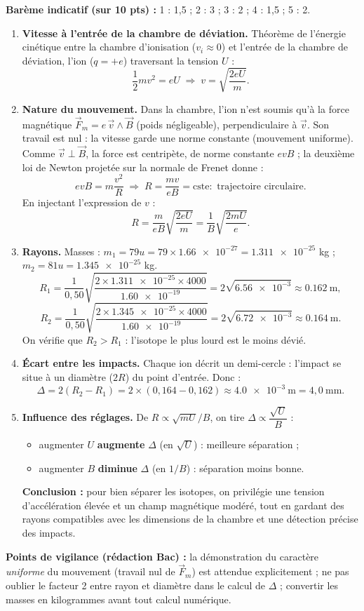 \documentclass[11pt]{article}
\begin{document}
\begin{corrige}
\textbf{Barème indicatif (sur 10 pts) :} 1 : 1,5 ; 2 : 3 ; 3 : 2 ; 4 : 1,5 ; 5 : 2.

\begin{enumerate}
\item \textbf{Vitesse à l'entrée de la chambre de déviation.} Théorème de l'énergie cinétique entre la chambre d'ionisation ($v_i \approx 0$) et l'entrée de la chambre de déviation, l'ion  ($q = +e$) traversant la tension $U$ :
\[
\frac{1}{2}mv^2 = eU \;\Longrightarrow\; \boxed{v = \sqrt{\frac{2eU}{m}}}.
\]
\item \textbf{Nature du mouvement.} Dans la chambre, l'ion n'est soumis qu'à la force magnétique $\vec{F}_m = e\,\vec{v}\wedge\vec{B}$ (poids négligeable), perpendiculaire à $\vec{v}$. Son travail est nul : la vitesse garde une norme constante (mouvement uniforme). Comme $\vec{v}\perp\vec{B}$, la force est centripète, de norme constante $evB$ ; la deuxième loi de Newton projetée sur la normale de Frenet donne :
\[
evB = m\frac{v^2}{R} \;\Longrightarrow\; R = \frac{mv}{eB} = \text{cste} : \text{ trajectoire circulaire.}
\]
En injectant l'expression de $v$ :
\[
R = \frac{m}{eB}\sqrt{\frac{2eU}{m}} = \boxed{\frac{1}{B}\sqrt{\frac{2mU}{e}}}.
\]
\item \textbf{Rayons.} Masses : $m_1 = 79u = 79\times\num{1,66e-27} = \num{1,311e-25}$ kg ; $m_2 = 81u = \num{1,345e-25}$ kg.
\[
R_1 = \frac{1}{0,50}\sqrt{\frac{2\times\num{1,311e-25}\times 4000}{\num{1,60e-19}}} = 2\sqrt{\num{6,56e-3}} \approx \num{0,162}~\mathrm{m},
\]
\[
R_2 = \frac{1}{0,50}\sqrt{\frac{2\times\num{1,345e-25}\times 4000}{\num{1,60e-19}}} = 2\sqrt{\num{6,72e-3}} \approx \num{0,164}~\mathrm{m}.
\]
On vérifie que $R_2 > R_1$ : l'isotope le plus lourd est le moins dévié.
\item \textbf{Écart entre les impacts.} Chaque ion décrit un demi-cercle : l'impact se situe à un diamètre ($2R$) du point d'entrée. Donc :
\[
\Delta = 2(R_2 - R_1) = 2\times(0,164 - 0,162) \approx \num{4,0e-3}~\mathrm{m} = 4,0~\mathrm{mm}.
\]
\item \textbf{Influence des réglages.} De $R \propto \sqrt{mU}/B$, on tire $\Delta \propto \dfrac{\sqrt{U}}{B}$ :
\begin{itemize}
\item augmenter $U$ \textbf{augmente} $\Delta$ (en $\sqrt{U}$) : meilleure séparation ;
\item augmenter $B$ \textbf{diminue} $\Delta$ (en $1/B$) : séparation moins bonne.
\end{itemize}
\textbf{Conclusion :} pour bien séparer les isotopes, on privilégie une tension d'accélération élevée et un champ magnétique modéré, tout en gardant des rayons compatibles avec les dimensions de la chambre et une détection précise des impacts.
\end{enumerate}
\textbf{Points de vigilance (rédaction Bac) :} la démonstration du caractère \emph{uniforme} du mouvement (travail nul de $\vec{F}_m$) est attendue explicitement ; ne pas oublier le facteur 2 entre rayon et diamètre dans le calcul de $\Delta$ ; convertir les masses en kilogrammes avant tout calcul numérique.
\end{corrige}
\end{document}
